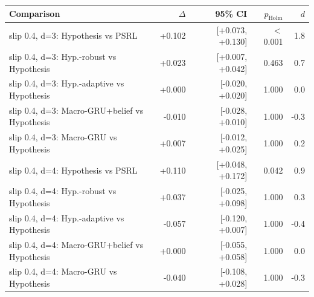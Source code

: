 \begin{tabular}{lrrrr}
\toprule
Comparison & $\Delta$ & 95\% CI & $p_{\text{Holm}}$ & $d$ \\
\midrule
slip 0.4, d=3: Hypothesis vs PSRL & +0.102 & [+0.073, +0.130] & $<$0.001 & 1.8 \\
slip 0.4, d=3: Hyp.-robust vs Hypothesis & +0.023 & [+0.007, +0.042] & 0.463 & 0.7 \\
slip 0.4, d=3: Hyp.-adaptive vs Hypothesis & +0.000 & [-0.020, +0.020] & 1.000 & 0.0 \\
slip 0.4, d=3: Macro-GRU+belief vs Hypothesis & -0.010 & [-0.028, +0.010] & 1.000 & -0.3 \\
slip 0.4, d=3: Macro-GRU vs Hypothesis & +0.007 & [-0.012, +0.025] & 1.000 & 0.2 \\
slip 0.4, d=4: Hypothesis vs PSRL & +0.110 & [+0.048, +0.172] & 0.042 & 0.9 \\
slip 0.4, d=4: Hyp.-robust vs Hypothesis & +0.037 & [-0.025, +0.098] & 1.000 & 0.3 \\
slip 0.4, d=4: Hyp.-adaptive vs Hypothesis & -0.057 & [-0.120, +0.007] & 1.000 & -0.4 \\
slip 0.4, d=4: Macro-GRU+belief vs Hypothesis & +0.000 & [-0.055, +0.058] & 1.000 & 0.0 \\
slip 0.4, d=4: Macro-GRU vs Hypothesis & -0.040 & [-0.108, +0.028] & 1.000 & -0.3 \\
\bottomrule
\end{tabular}
